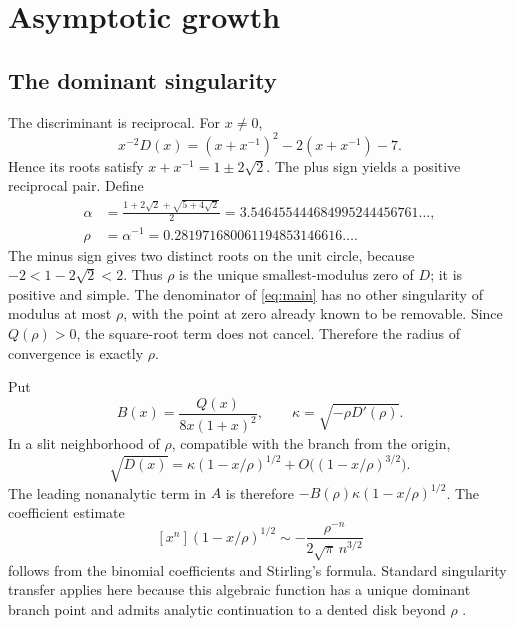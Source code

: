 \documentclass[11pt,a4paper]{article}
\theoremstyle{definition}
\theoremstyle{remark}
\begin{document}
\section{Asymptotic growth}\label{sec:asymptotics}

\subsection{The dominant singularity}

The discriminant is reciprocal. For $x\neq0$,
\begin{equation}\label{eq:reciprocal}
 x^{-2}D(x)=(x+x^{-1})^2-2(x+x^{-1})-7.
\end{equation}
Hence its roots satisfy $x+x^{-1}=1\pm2\sqrt2$. The plus sign yields a
positive reciprocal pair. Define
\begin{align}
 \alpha&=\frac{1+2\sqrt2+\sqrt{5+4\sqrt2}}2
       =3.546455444684995244456761\ldots,\label{eq:alpha}\\
 \rho&=\alpha^{-1}
       =0.281971680061194853146616\ldots.\label{eq:rho}
\end{align}
The minus sign gives two distinct roots on the unit circle, because
$-2<1-2\sqrt2<2$. Thus $\rho$ is the unique smallest-modulus zero of $D$;
it is positive and simple. The denominator of \eqref{eq:main} has no
other singularity of modulus at most $\rho$, with the point at zero
already known to be removable. Since $Q(\rho)>0$, the square-root term
does not cancel. Therefore the radius of convergence is exactly $\rho$.

Put
\begin{equation}\label{eq:Bkappa}
 B(x)=\frac{Q(x)}{8x(1+x)^2},\qquad
 \kappa=\sqrt{-\rho D'(\rho)}.
\end{equation}
In a slit neighborhood of $\rho$, compatible with the branch from the
origin,
\[
 \sqrt{D(x)}=\kappa(1-x/\rho)^{1/2}
                 +O\bigl((1-x/\rho)^{3/2}\bigr).
\]
The leading nonanalytic term in $A$ is therefore
$-B(\rho)\kappa(1-x/\rho)^{1/2}$.
The coefficient estimate
\[
 [x^n](1-x/\rho)^{1/2}
 \sim-\frac{\rho^{-n}}{2\sqrt\pi\,n^{3/2}}
\]
follows from the binomial coefficients and Stirling's formula. Standard
singularity transfer applies here because this algebraic function has a
unique dominant branch point and admits analytic continuation to a dented
disk beyond $\rho$ \cite{flajolet-sedgewick}.
\end{document}
